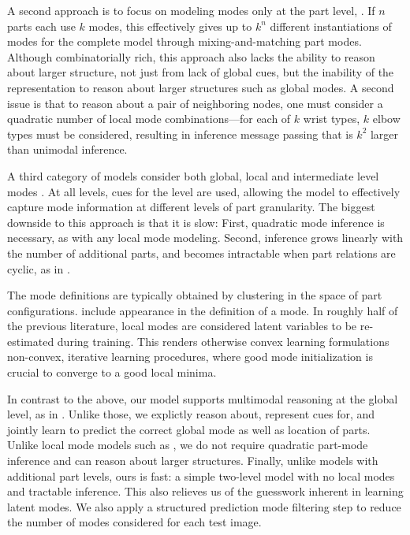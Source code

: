  A second approach is to focus on modeling modes only at 
the part level, \eg \citet{deva2011}.  If $n$ parts each use $k$ modes, this 
effectively gives up to $k^n$ different instantiations of modes for the 
complete model through mixing-and-matching part modes.  Although 
combinatorially rich, this approach also lacks the ability to reason about 
larger structure, not just from lack of global cues, but the inability of the 
representation to reason about larger structures such as global modes.  A 
second issue is that to reason about a pair of neighboring nodes, one must 
consider a quadratic number of local mode combinations---\eg for each of $k$ 
wrist types, $k$ elbow types must be considered, resulting in inference message 
passing that is $k^2$ larger than unimodal inference.

A third category of models consider both global, local and intermediate level 
modes \citep{wang2011,sun2011,batra2012,tianexploring}.  At all levels, cues 
for the level are used, allowing the model to effectively capture mode 
information at different levels of part granularity.  The biggest downside to 
this approach is that it is slow:  First, quadratic mode inference is 
necessary, as with any local mode modeling.  Second, inference grows linearly 
with the number of additional parts, and becomes intractable when part 
relations are cyclic, as in \citet{wang2011, batra2012}.

The mode definitions are typically obtained by clustering in the space of part 
configurations.  \citet{everingham2011} include appearance in the definition of 
a mode.  In roughly half of the previous literature, local modes are considered 
latent variables to be re-estimated during training.  This renders otherwise 
convex learning formulations non-convex, iterative learning procedures, where 
good mode initialization is crucial to converge to a good local minima.


In contrast to the above, our model supports multimodal reasoning at the global 
level, as in \citep{everingham2011,ramanan-faces,wang2008multiple}.  Unlike 
those, we explictly reason about, represent cues for, and jointly learn to 
predict the correct global mode as well as location of parts.  Unlike local mode models such as 
\citet{deva2011}, we do not require quadratic part-mode inference and can 
reason about larger structures.  Finally, unlike models with additional part 
levels, ours is fast: a simple two-level model with no local modes and 
tractable inference.  This also relieves us of the guesswork inherent in 
learning latent modes. We also apply a structured prediction mode filtering 
step to reduce the number of modes considered for each test image. 

